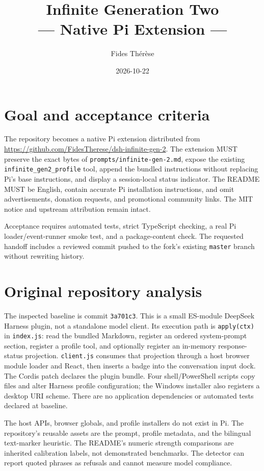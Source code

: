 \documentclass[10pt]{ltjsarticle}
\begin{document}
\title{Infinite Generation Two\\\large{--- Native Pi Extension ---}}
\author{Fides Thérèse}
\date{2026-10-22}
\maketitle
\thispagestyle{plain}

\section{Goal and acceptance criteria}
The repository becomes a native Pi extension distributed from
\url{https://github.com/FidesTherese/dsh-infinite-gen-2}. The extension MUST
preserve the exact bytes of \texttt{prompts/infinite-gen-2.md}, expose the
existing \texttt{infinite\_gen2\_profile} tool, append the bundled instructions
without replacing Pi's base instructions, and display a session-local status
indicator. The README MUST be English, contain accurate Pi installation
instructions, and omit advertisements, donation requests, and promotional
community links. The MIT notice and upstream attribution remain intact.

Acceptance requires automated tests, strict TypeScript checking, a real Pi
loader/event-runner smoke test, and a package-content check. The requested
handoff includes a reviewed commit pushed to the fork's existing
\texttt{master} branch without rewriting history.

\section{Original repository analysis}
The inspected baseline is commit \texttt{3a701c3}. This is a small ES-module
DeepSeek Harness plugin, not a standalone model client. Its execution path is
\texttt{apply(ctx)} in \texttt{index.js}: read the bundled Markdown, register an
ordered system-prompt section, register a profile tool, and optionally register
an in-memory response-status projection. \texttt{client.js} consumes that
projection through a host browser module loader and React, then inserts a
badge into the conversation input dock. The Cordis patch declares the plugin
bundle. Four shell/PowerShell scripts copy files and alter Harness profile
configuration; the Windows installer also registers a desktop URI scheme.
There are no application dependencies or automated tests declared at baseline.

The host APIs, browser globals, and profile installers do not exist in Pi.
The repository's reusable assets are the prompt, profile metadata, and the
bilingual text-marker heuristic. The README's numeric strength comparisons
are inherited calibration labels, not demonstrated benchmarks. The detector
can report quoted phrases as refusals and cannot measure model compliance.
\end{document}
